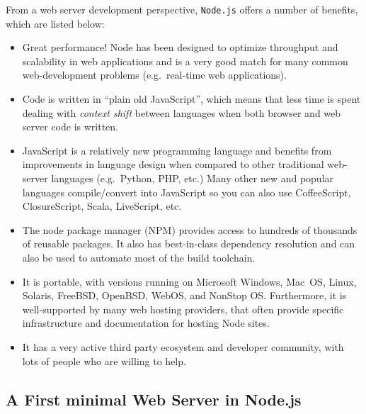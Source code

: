 \documentclass[a4paper, justified, notoc]{tufte-handout} %
\begin{document}
From a web server development perspective, \texttt{Node.js} offers a number of benefits, which are listed below:
\begin{itemize}
	\item Great performance! Node has been designed to optimize throughput and scalability in web applications and is a very good match for many common web-development problems (e.g.\ real-time web applications).
	\item Code is written in ``plain old JavaScript'', which means that less time is spent dealing with \emph{context shift} between languages when both browser and web server code is written.
	\item JavaScript is a relatively new programming language and benefits from improvements in language design when compared to other traditional web-server languages (e.g.\ Python, PHP, etc.) Many other new and popular languages compile/convert into JavaScript so you can also use CoffeeScript, ClosureScript, Scala, LiveScript, etc.
	\item The node package manager (NPM) provides access to hundreds of thousands of reusable packages. It also has best-in-class dependency resolution and can also be used to automate most of the build toolchain.
	\item It is portable, with versions running on Microsoft Windows, Mac~OS, Linux, Solaris, FreeBSD, OpenBSD, WebOS, and NonStop OS. Furthermore, it is well-supported by many web hosting providers, that often provide specific infrastructure and documentation for hosting Node sites.
	\item It has a very active third party ecosystem and developer community, with lots of people who are willing to help.
\end{itemize}




\subsection{A First minimal Web Server in Node.js} %
\label{sub:a_first_minimal_web_server_in_node}

\end{document}
